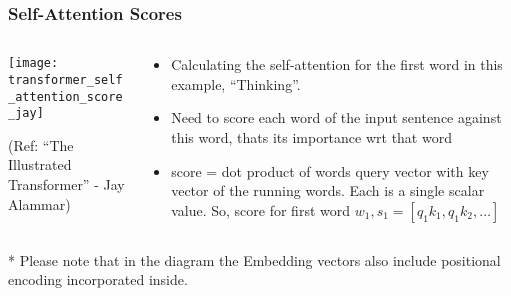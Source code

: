\begin{frame}[fragile]\frametitle{Self-Attention Scores}

\begin{columns}
    \begin{column}[T]{0.5\linewidth}
\begin{center}
\texttt{[image: transformer\_self\_attention\_score\_jay]}


{\tiny (Ref: ``The Illustrated Transformer'' - Jay Alammar)}
\end{center}		

		\end{column}
    \begin{column}[T]{0.5\linewidth}

\begin{itemize}
\item Calculating the self-attention for the first word in this example, ``Thinking''. 
\item Need to score each word of the input sentence against this word, thats its importance wrt that word
\item score = dot product of words query vector with key vector of the running words. Each is a single scalar value. So, score for first word $w_1, s_1 = [ q_1 k_1,  q_1 k_2 , \ldots] $
\end{itemize}
    \end{column}
  \end{columns}

* Please note that in the diagram the Embedding vectors also include positional encoding incorporated inside.
\end{frame}


